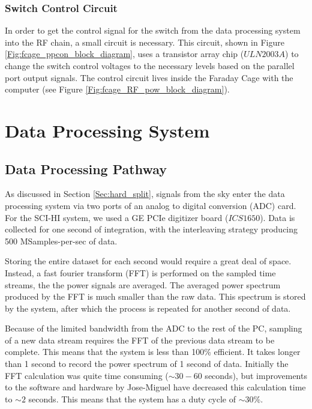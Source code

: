 \subsubsection{Switch Control Circuit}

In order to get the control signal for the switch from the data processing system into the RF chain, a small circuit is necessary. This circuit, shown in Figure \ref{Fig:fcage_ppcon_block_diagram}, uses a transistor array chip ($ULN2003A$) to change the switch control voltages to the necessary levels based on the parallel port output signals. The control circuit lives inside the Faraday Cage with the computer (see Figure \ref{Fig:fcage_RF_pow_block_diagram}). 



\section{Data Processing System}


\subsection{Data Processing Pathway}

As discussed in Section \ref{Sec:hard_split}, signals from the sky enter the data processing system via two ports of an analog to digital conversion (ADC) card. For the SCI-HI system, we used a GE PCIe digitizer board ($ICS1650$). Data is collected for one second of integration, with the interleaving strategy producing 500 MSamples-per-sec of data. 

Storing the entire dataset for each second would require a great deal of space. Instead, a fast fourier transform (FFT) is performed on the sampled time streams, the the power signals are averaged. The averaged power spectrum produced by the FFT is much smaller than the raw data. This spectrum is stored by the system, after which the process is repeated for another second of data. 

Because of the limited bandwidth from the ADC to the rest of the PC, sampling of a new data stream requires the FFT of the previous data stream to be complete. This means that the system is less than 100\% efficient. It takes longer than 1 second to record the power spectrum of 1 second of data. Initially the FFT calculation was quite time consuming ($\sim 30-60$ seconds), but improvements to the software and hardware by Jose-Miguel have decreased this calculation time to $\sim 2$ seconds. This means that the system has a duty cycle of $\sim30$\%. 

